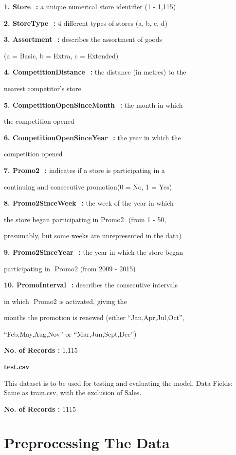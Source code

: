 \documentclass[letterpaper, 10 pt, conference]{ieeeconf}  %
\begin{document}
\textbf{1. Store ​ :} a unique numerical store identifier (1 - 1,115)

\textbf{2. StoreType ​ :} 4 different types of stores (a, b, c, d)

\textbf{3. Assortment ​ :} describes the assortment of goods 

(a = Basic, b = Extra, c = Extended)

\textbf{4. CompetitionDistance ​ :} the distance (in metres) to the 

nearest competitor’s store

\textbf{5. CompetitionOpenSinceMonth ​ :} the month in which 

the competition opened

\textbf{6. CompetitionOpenSinceYear ​ :} the year in which the 

competition opened

\textbf{7. Promo2 ​ :} indicates if a store is participating in a 

continuing and consecutive promotion(0 = No, 1 = Yes)

\textbf{8. Promo2SinceWeek ​ :} the week of the year in which 

the store began participating in Promo2 ​ (from 1 - 50,

presumably, but some weeks are unrepresented in the data)

\textbf{9. Promo2SinceYear ​ :} the year in which the store began 

participating in ​ Promo2 (from 2009 - 2015)

\textbf{10. PromoInterval ​ :} describes the consecutive intervals 

in which ​ Promo2 is activated, giving the 

months the promotion is renewed (either “Jan,Apr,Jul,Oct”, 

“Feb,May,Aug,Nov” or “Mar,Jun,Sept,Dec”)

\textbf{No. of Records :} 1,115\bigskip



\textbf{test.csv}\bigskip

This dataset is to be used for testing and evaluating the model.
Data Fields: Same as train.csv, with the exclusion of Sales.

\textbf{No. of Records :} 1115



\section{Preprocessing The Data}
\end{document}
